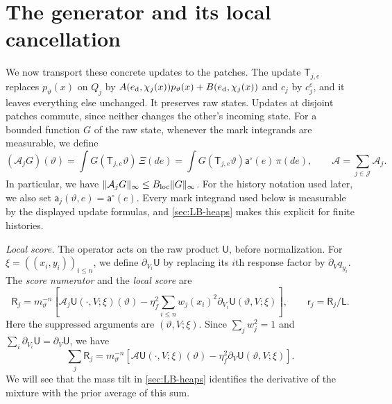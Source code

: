\section{The generator and its local cancellation}\label{sec:LB-rows}

We now transport these concrete updates to the patches. The update
$\mathsf T_{j,e}$ replaces $p_\vartheta(x)$ on $Q_j$ by
$A(e_{\rm d},\chi_j(x))p_\vartheta(x)+B(e_{\rm d},\chi_j(x))$
and $c_j$ by $c_j^e$, and it leaves everything else unchanged. It
preserves raw states. Updates at disjoint patches commute, since neither
changes the other's incoming state. For a bounded function $G$ of the
raw state, whenever the mark integrands are measurable, we define
\begin{equation}\label{eq:LB-generator}
 (\mathcal A_jG)(\vartheta)=\int G(\mathsf T_{j,e}\vartheta)\,\Xi(de)
 =\int G(\mathsf T_{j,e}\vartheta)\mathsf a^\circ(e)\,\pi(de),
 \qquad \mathcal A=\sum_{j\in\mathcal J}\mathcal A_j.
\end{equation}
In particular, we have $\|\mathcal A_jG\|_\infty\le B_{\rm loc}\|G\|_\infty$.
For the history notation used later, we also set
$\mathsf a_j(\vartheta,e)=\mathsf a^\circ(e)$.
Every mark integrand used below is measurable by the displayed update
formulas, and \cref{sec:LB-heaps} makes this explicit for finite
histories.

\emph{Local score.} The
operator acts on the raw product $\mathsf U$, before normalization.
For $\xi=((x_i,y_i))_{i\le n}$, we define $\partial_{V_i}\mathsf U$ by
replacing its $i$th response factor by $\partial_Vq_{y_i}$. The
\emph{score numerator} and the \emph{local score} are
\begin{equation}\label{eq:LB-score}
 \mathsf R_j=m_\vartheta^{-n}\left[
 \mathcal A_j\mathsf U(\cdot,V;\xi)(\vartheta)
 -\eta_f^2\sum_{i\le n}w_j(x_i)^2\partial_{V_i}\mathsf U(\vartheta,V;\xi)
 \right],
 \qquad \mathsf r_j=\mathsf R_j/\mathsf L.
\end{equation}
Here the suppressed arguments are $(\vartheta,V;\xi)$. Since
$\sum_jw_j^2=1$ and $\sum_i\partial_{V_i}\mathsf U=\partial_V\mathsf U$,
we have
\begin{equation}\label{eq:LB-score-sum}
 \sum_j\mathsf R_j
 =m_\vartheta^{-n}\left[
 \mathcal A\mathsf U(\cdot,V;\xi)(\vartheta)
 -\eta_f^2\partial_V\mathsf U(\vartheta,V;\xi)\right].
\end{equation}
We will see that the mass tilt in \cref{sec:LB-heaps} identifies the
derivative of the mixture with the prior average of this sum.

